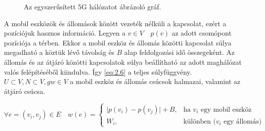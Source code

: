 \documentclass[a4paper,oneside]{article}
\begin{document}
\usetikzlibrary{arrows.meta}
\begin{figure}[h]
  \centering
  \caption{Az egyszerűsített 5G hálózatot ábrázoló gráf.} \label{fig:2.2}
\end{figure}

A mobil eszközök és állomások között vezeték nélküli a kapcsolat,
ezért a pozíciójuk hasznos információ.
Legyen a $v \in V \quad p(v)$ az adott csomópont pozíciója a térben.
Ekkor a mobil eszköz és állomás közötti kapcsolat súlya megadható a köztük lévő távolság
és $B$ alap feldolgozási idő összegeként.
Az állomás és az átjáró közötti kapcsolatok súlya beállítható az adott maghálózat valós felépítéséből kiindulva.
Így \eqref{eq:2.6} a teljes súlyfüggvény.
$U \subset V, N \subset V, gw \in V$ a mobil eszköz és állomás csúcsok halmazai, valamint az átjáró csúcsa.

\begin{equation}
  \forall e = (v_i, v_j) \in E \quad w(e) = \begin{cases}
    \vert p(v_i) - p(v_j) \vert + B, & \text{ha $v_i$ egy mobil eszköz} \\
    W_i, & \text{különben ($v_i$ egy állomás)}
  \end{cases} \label{eq:2.6}
\end{equation}
\end{document}
